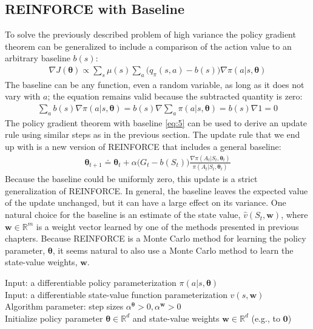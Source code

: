 {\subsection{REINFORCE with Baseline}
To solve the previously described problem of high variance the policy gradient theorem can be generalized to include a comparison of the
action value to an arbitrary baseline $b(s)$:
\begin{align}\label{eq:5}
    \nabla J(\bm{\theta})\propto\sum_{s}\mu(s)\sum_a \Big(q_\pi(s,a)-b(s)\Big)\nabla\pi(a|s, \bm{\theta})
\end{align}
The baseline can be any function, even a random variable, as long as it does not vary with $a$; the equation remains valid because the subtracted quantity is zero:
\begin{align*}
    \sum_a b(s)\nabla\pi(a|s, \bm{\theta})=b(s)\nabla\sum_a\pi(a|s, \bm{\theta})=b(s)\nabla 1=0
\end{align*}
The policy gradient theorem with baseline \ref{eq:5} can be used to derive an update
rule using similar steps as in the previous section. The update rule that we end up with
is a new version of REINFORCE that includes a general baseline:
\begin{align}\label{eq:6}
    \bm{\theta}_{t+1}\doteq\bm{\theta}_t+\alpha\Big(G_t-b(S_t)\Big)\frac{\nabla\pi(A_t|S_t, \bm{\theta}_t)}{\pi(A_t|S_t, \bm{\theta}_t)}
\end{align}
Because the baseline could be uniformly zero, this update is a strict generalization of REINFORCE. In general, the baseline leaves the expected value of the update unchanged, but it can have a large effect on its variance.
One natural choice for the baseline is an estimate of the state value, $\hat{v}(S_t,\bm{w})$, where $\bm{w}\in \mathbb{R}^m$ is a weight vector learned by one of the methods presented in previous chapters.
Because REINFORCE is a Monte Carlo method for learning the policy parameter, $\bm{\theta}$,
it seems natural to also use a Monte Carlo method to learn the state-value weights, $\bm{w}$.

\begin{tcolorbox}[colback=black!7!white,colframe=black!75!white,title=\textbf{REINFORCE with Baseline (episodic), for $\pi_\theta\approx\pi_* $}]
    Input: a differentiable policy parameterization $\pi(a|s,\bm{\theta})$\\
    Input: a differentiable state-value function parameterization $\hat{v}(s,\bm{w})$\\
    Algorithm parameter: step sizes $\alpha^{\bm{\theta}} > 0, \alpha^{\bm{w}} > 0$\\
    Initialize policy parameter $\bm{\theta}\in\mathbb{R}^d$ and state-value weights $\bm{w}\in\mathbb{R}^d$  (e.g., to $\bm{0}$)\\
    

\end{tcolorbox}}
